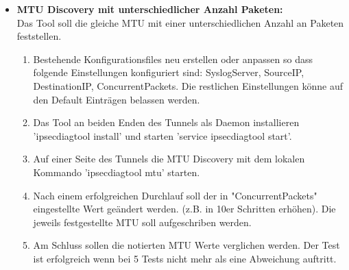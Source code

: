 \begin{itemize}
\item[\Square] \textbf{MTU Discovery mit unterschiedlicher Anzahl Paketen:}\\
Das Tool soll die gleiche MTU mit einer unterschiedlichen Anzahl an Paketen feststellen.
\begin{enumerate} \itemsep1pt \parskip0pt 
  \item Bestehende Konfigurationsfiles neu erstellen oder anpassen so dass folgende Einstellungen konfiguriert sind: SyslogServer, SourceIP, DestinationIP, ConcurrentPackets. Die restlichen Einstellungen könne auf den Default Einträgen belassen werden.
  \item Das Tool an beiden Enden des Tunnels als Daemon installieren 'ipsecdiagtool install' und starten 'service ipsecdiagtool start'.
  \item Auf einer Seite des Tunnels die MTU Discovery mit dem lokalen Kommando 'ipsecdiagtool mtu' starten.
  \item Nach einem erfolgreichen Durchlauf soll der in "ConcurrentPackets" eingestellte Wert geändert werden. (z.B. in 10er Schritten erhöhen). Die jeweils festgestellte MTU soll aufgeschriben werden.
    \item Am Schluss sollen die notierten MTU Werte verglichen werden. Der Test ist erfolgreich wenn bei 5 Tests nicht mehr als eine Abweichung auftritt.
\end{enumerate}

\end{itemize}
